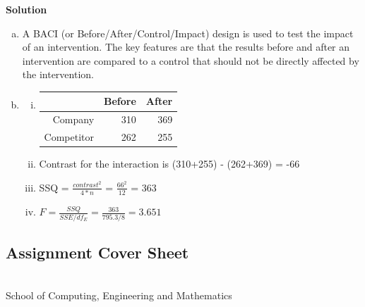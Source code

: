\documentclass[a4paper,oneside]{book}
\begin{document}
\textbf{Solution}
\begin{enumerate}[a)]
\item A BACI (or Before/After/Control/Impact) design is used to
  test the impact of an intervention. The key features are that the
  results before and after an intervention are compared to a control
  that should not be directly affected by the intervention.
\item \begin{enumerate}[i)]
\item \begin{tabular}{rrr}
  \hline
 & Before & After \\ 
  \hline
Company & 310 & 369 \\ 
  Competitor & 262 & 255 \\ 
   \hline
\end{tabular}
\item Contrast for the interaction is (310+255) - (262+369) = -66
\item SSQ = $\frac{contrast^2}{4*n}$ = $\frac{66^2}{12}$ = 363
\item $F = \frac{SSQ}{SSE/df_E} = \frac{363}{795.3/8} = 3.651$
\end{enumerate}
\end{enumerate}

\newpage
\thispagestyle{empty}

\subsection*{Assignment Cover Sheet}

\begin{flushright}
 \\[1em]
School of Computing, Engineering and Mathematics \\
\end{flushright}
\end{document}
